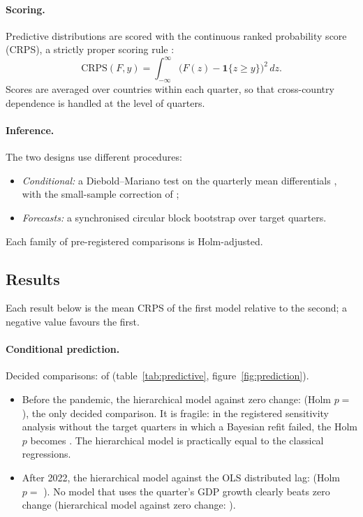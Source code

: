 \paragraph{Scoring.} Predictive distributions are scored with the continuous ranked
probability score (CRPS), a strictly proper scoring rule \citep{gneiting2007scoring}:
\[
  \mathrm{CRPS}(F,y)=\int_{-\infty}^{\infty}\big(F(z)-\mathbf 1\{z\ge y\}\big)^2\,dz .
\]
Scores are averaged over countries within each quarter, so that cross-country dependence is
handled at the level of quarters.

\paragraph{Inference.} The two designs use different procedures:
\begin{itemize}
  \item \emph{Conditional:} a Diebold--Mariano test on the quarterly mean differentials
    \citep{diebold1995accuracy}, with the small-sample correction of
    \citet{harvey1997dm};
  \item \emph{Forecasts:} a synchronised circular block bootstrap over target quarters.
\end{itemize}
Each family of pre-registered comparisons is Holm-adjusted.

\subsection{Results}

Each result below is the mean CRPS of the first model relative to the second; a negative
value favours the first.

\paragraph{Conditional prediction.} Decided comparisons:  of
 (table~\ref{tab:predictive}, figure~\ref{fig:prediction}).
\begin{itemize}
  \item Before the pandemic, the hierarchical model against zero change: 
    (Holm $p=$ ), the only decided comparison. It is fragile: in the
    registered sensitivity analysis without the target quarters in which a Bayesian refit
    failed, the Holm $p$ becomes . The hierarchical model is
    practically equal to the classical regressions.
  \item After 2022, the hierarchical model against the OLS distributed lag:
     (Holm $p=$ ). No model that uses the quarter's GDP
    growth clearly beats zero change (hierarchical model against zero change:
    ).
\end{itemize}

